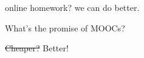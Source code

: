 \documentclass[14pt]{beamer}
\newcommand{\clearbackgroundpicture}{\usebackgroundtemplate{}}
\begin{document}
\clearbackgroundpicture
\begin{frame}[nofills]
 online homework?  we can do better.
\end{frame}

\begin{frame}[nofills]
 What's the promise of MOOCs?

 \sout{Cheaper?}  Better!

 
\end{frame}






















\end{document}
